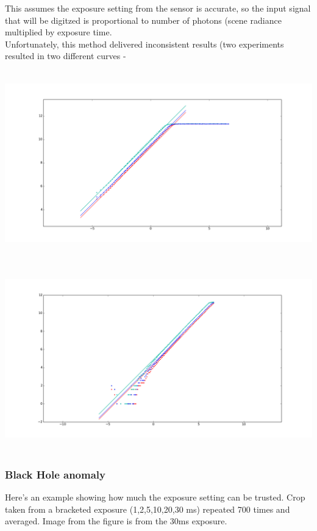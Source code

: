 This assumes the exposure setting from the sensor is accurate, so the input signal that will be digitzed is proportional to number of photons (scene radiance multiplied by exposure time.\\

Unfortunately, this method delivered inconsistent results (two experiments resulted in two different curves -

\begin{center}
\includegraphics[height=8cm]{images/curve-new}
\end{center}

\begin{center}
\includegraphics[height=8cm]{images/curve-old}
\end{center}


\subsubsection{Black Hole anomaly}

Here's an example showing how much the exposure setting can be trusted. Crop taken from a bracketed exposure (1,2,5,10,20,30 ms) repeated 700 times and averaged. Image from the figure is from the 30ms exposure.\\ 

